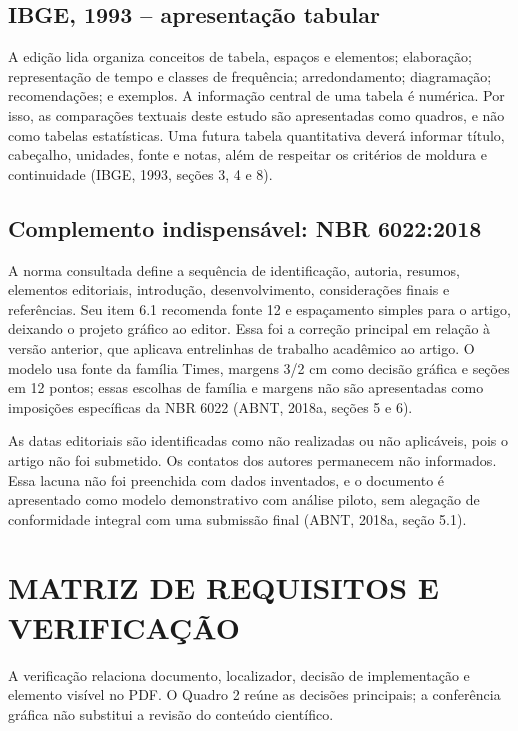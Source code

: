 \subsection{IBGE, 1993 -- apresentação tabular}
A edição lida organiza conceitos de tabela, espaços e elementos; elaboração; representação de tempo e classes de frequência; arredondamento; diagramação; recomendações; e exemplos. A informação central de uma tabela é numérica. Por isso, as comparações textuais deste estudo são apresentadas como quadros, e não como tabelas estatísticas. Uma futura tabela quantitativa deverá informar título, cabeçalho, unidades, fonte e notas, além de respeitar os critérios de moldura e continuidade (IBGE, 1993, seções 3, 4 e 8).

\subsection{Complemento indispensável: NBR 6022:2018}
A norma consultada define a sequência de identificação, autoria, resumos, elementos editoriais, introdução, desenvolvimento, considerações finais e referências. Seu item 6.1 recomenda fonte 12 e espaçamento simples para o artigo, deixando o projeto gráfico ao editor. Essa foi a correção principal em relação à versão anterior, que aplicava entrelinhas de trabalho acadêmico ao artigo. O modelo usa fonte da família Times, margens 3/2 cm como decisão gráfica e seções em 12 pontos; essas escolhas de família e margens não são apresentadas como imposições específicas da NBR 6022 (ABNT, 2018a, seções 5 e 6).

As datas editoriais são identificadas como não realizadas ou não aplicáveis, pois o artigo não foi submetido. Os contatos dos autores permanecem não informados. Essa lacuna não foi preenchida com dados inventados, e o documento é apresentado como modelo demonstrativo com análise piloto, sem alegação de conformidade integral com uma submissão final (ABNT, 2018a, seção 5.1).

\section{MATRIZ DE REQUISITOS E VERIFICAÇÃO}
A verificação relaciona documento, localizador, decisão de implementação e elemento visível no PDF. O Quadro 2 reúne as decisões principais; a conferência gráfica não substitui a revisão do conteúdo científico.

